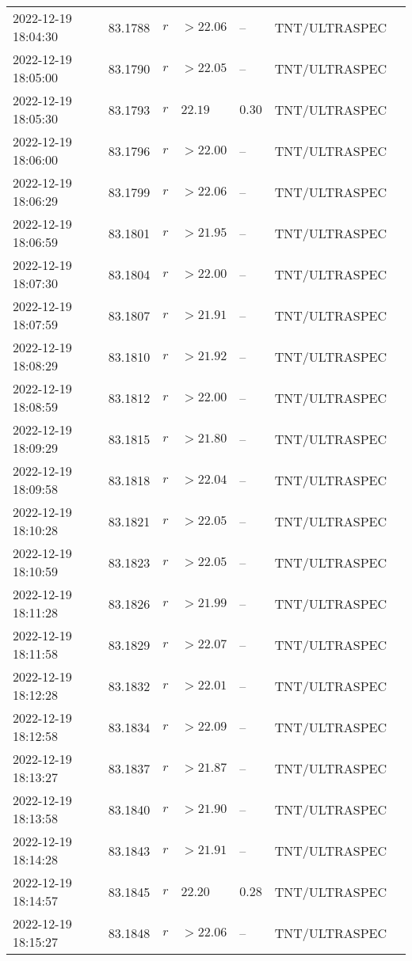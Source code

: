 \documentclass{nature_plusfigure}
\begin{document}
\begin{supplement}
\begin{center}
\begin{longtable}{lllllll}
2022-12-19 18:04:30 & 83.1788 & $r$ & $>22.06$ & -- & TNT/ULTRASPEC &  \\ 
2022-12-19 18:05:00 & 83.1790 & $r$ & $>22.05$ & -- & TNT/ULTRASPEC &  \\ 
2022-12-19 18:05:30 & 83.1793 & $r$ & $22.19$ & $0.30$ & TNT/ULTRASPEC &  \\ 
2022-12-19 18:06:00 & 83.1796 & $r$ & $>22.00$ & -- & TNT/ULTRASPEC &  \\ 
2022-12-19 18:06:29 & 83.1799 & $r$ & $>22.06$ & -- & TNT/ULTRASPEC &  \\ 
2022-12-19 18:06:59 & 83.1801 & $r$ & $>21.95$ & -- & TNT/ULTRASPEC &  \\ 
2022-12-19 18:07:30 & 83.1804 & $r$ & $>22.00$ & -- & TNT/ULTRASPEC &  \\ 
2022-12-19 18:07:59 & 83.1807 & $r$ & $>21.91$ & -- & TNT/ULTRASPEC &  \\ 
2022-12-19 18:08:29 & 83.1810 & $r$ & $>21.92$ & -- & TNT/ULTRASPEC &  \\ 
2022-12-19 18:08:59 & 83.1812 & $r$ & $>22.00$ & -- & TNT/ULTRASPEC &  \\ 
2022-12-19 18:09:29 & 83.1815 & $r$ & $>21.80$ & -- & TNT/ULTRASPEC &  \\ 
2022-12-19 18:09:58 & 83.1818 & $r$ & $>22.04$ & -- & TNT/ULTRASPEC &  \\ 
2022-12-19 18:10:28 & 83.1821 & $r$ & $>22.05$ & -- & TNT/ULTRASPEC &  \\ 
2022-12-19 18:10:59 & 83.1823 & $r$ & $>22.05$ & -- & TNT/ULTRASPEC &  \\ 
2022-12-19 18:11:28 & 83.1826 & $r$ & $>21.99$ & -- & TNT/ULTRASPEC &  \\ 
2022-12-19 18:11:58 & 83.1829 & $r$ & $>22.07$ & -- & TNT/ULTRASPEC &  \\ 
2022-12-19 18:12:28 & 83.1832 & $r$ & $>22.01$ & -- & TNT/ULTRASPEC &  \\ 
2022-12-19 18:12:58 & 83.1834 & $r$ & $>22.09$ & -- & TNT/ULTRASPEC &  \\ 
2022-12-19 18:13:27 & 83.1837 & $r$ & $>21.87$ & -- & TNT/ULTRASPEC &  \\ 
2022-12-19 18:13:58 & 83.1840 & $r$ & $>21.90$ & -- & TNT/ULTRASPEC &  \\ 
2022-12-19 18:14:28 & 83.1843 & $r$ & $>21.91$ & -- & TNT/ULTRASPEC &  \\ 
2022-12-19 18:14:57 & 83.1845 & $r$ & $22.20$ & $0.28$ & TNT/ULTRASPEC &  \\ 
2022-12-19 18:15:27 & 83.1848 & $r$ & $>22.06$ & -- & TNT/ULTRASPEC &  \\ 

\end{longtable}
\end{center}
\end{supplement}
\end{document}
